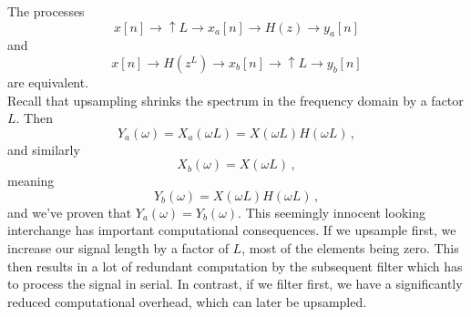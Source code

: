 %
\begin{iden}
  The processes
  \begin{displaymath}
    x[n] \longrightarrow \boxed{\uparrow L} \longrightarrow x_a[n]
    \longrightarrow \boxed{H(z)} \longrightarrow y_a[n]
  \end{displaymath}
  and
  \begin{displaymath}
    x[n] \longrightarrow \boxed{H\left(z^L\right)} \longrightarrow x_b[n]
    \longrightarrow \boxed{\uparrow L} \longrightarrow y_b[n]
  \end{displaymath}
  are equivalent.\\

  Recall that upsampling shrinks the spectrum in the frequency domain by a factor
  $L$. Then
  \begin{displaymath}
    Y_a(\omega) = X_a(\omega L) = X(\omega L)H(\omega L) \,,
  \end{displaymath}
  and similarly
  \begin{displaymath}
    X_b(\omega) = X(\omega L) \,,
  \end{displaymath}
  meaning
  \begin{displaymath}
    Y_b(\omega) = X(\omega L)H(\omega L) \,,
  \end{displaymath}
  and we've proven that $Y_a(\omega) = Y_b(\omega)$. This seemingly innocent looking
  interchange has important computational consequences. If we upsample first, we increase
  our signal length by a factor of $L$, most of the elements being zero. This then
  results in a lot of redundant computation by the subsequent filter which has to
  process the signal in serial. In contrast, if we filter first, we have a significantly
  reduced computational overhead, which can later be upsampled.
\end{iden}

